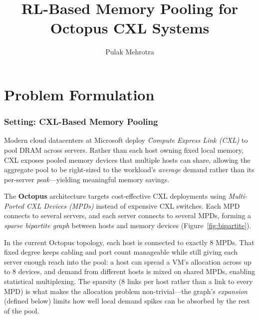 \documentclass[11pt]{article}
\title{RL-Based Memory Pooling for Octopus CXL Systems}
\author{Pulak Mehrotra}
\date{}
\begin{document}
\maketitle
\tableofcontents
\newpage

\section{Problem Formulation}

\subsubsection*{Setting: CXL-Based Memory Pooling}

Modern cloud datacenters at Microsoft deploy \emph{Compute Express Link (CXL)}
to pool DRAM across servers.  Rather than each host owning fixed local memory,
CXL exposes pooled memory devices that multiple hosts can share, allowing the
aggregate pool to be right-sized to the workload's \emph{average} demand
rather than its per-server \emph{peak}---yielding meaningful memory savings.

The \textbf{Octopus} architecture targets cost-effective CXL deployments using
\emph{Multi-Ported CXL Devices (MPDs)} instead of expensive CXL switches.
Each MPD connects to several servers, and each server connects to several MPDs,
forming a \emph{sparse bipartite graph} between hosts and memory devices
(Figure~\ref{fig:bipartite}).

In the current Octopus topology, each host is connected to exactly 8 MPDs.
That fixed degree keeps cabling and port count manageable while still giving
each server enough reach into the pool: a host can spread a VM's allocation
across up to 8 devices, and demand from different hosts is mixed on shared MPDs,
enabling statistical multiplexing.  The sparsity (8 links per host rather than
a link to every MPD) is what makes the allocation problem non-trivial---the
graph's \emph{expansion} (defined below) limits how well local demand spikes
can be absorbed by the rest of the pool.
\end{document}
